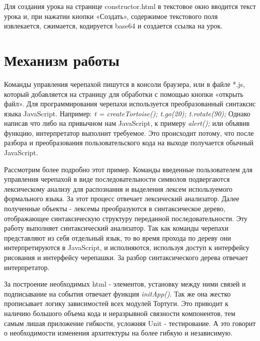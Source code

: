 Для создания урока на странице constructor.html в текстовое окно вводится текст урока и, при нажатии кнопки «Создать», содержимое текстового поля извлекается, сжимается, кодируется base64 и создается ссылка на урок.\par


\section{Механизм работы} \label{sect1_1}
Команды управления черепахой пишутся в консоли браузера, или в файле *.js, который добавляется на страницу для обработки с помощью кнопки «открыть файл». Для программирования черепахи используется преобразованный синтаксис языка JavaScript. Например:
\textit{
t = createTortoise();
t.go(20);
t.rotate(90);
}
Однако написав что либо на привычном нам JavaScript, к примеру \textit{alert();} или объявив функцию, интерпретатор выполнит требуемое. Это происходит потому, что после разбора и преобразования пользовательского кода на выходе получается обычный JavaScript.

Рассмотрим более подробно этот пример. Команды введенные пользователем для управления черепахой в виде последовательности символов подвергаются лексическому анализу для распознания и выделения лексем используемого формального языка. За этот процесс отвечает лексический анализатор. Далее полученные объекты - лексемы преобразуются в синтаксическое дерево, отображающее синтаксическую структуру переданной последовательности. Эту работу выполняет синтаксический анализатор. Так как команды черепахи представляют из себя отдельный язык, то во время прохода по дереву они интерпретируются в JavaScript, и исполняются, используя доступ к интерфейсу рисования и интерфейсу черепашки. За разбор синтаксического дерева отвечает интерпретатор.

За построение необходимых html - элементов, установку между ними связей и подписывание на события отвечает функция \textit{initApp()}. Так же она жестко прописывает логику зависимостей всех модулей Тортуги. Это приводит к наличию большого объема кода и неразрывной связности компонентов, тем самым лишая приложение гибкости, усложняя Unit - тестирование. А это говорит о необходимости изменения архитектуры на более гибкую и независимую.



